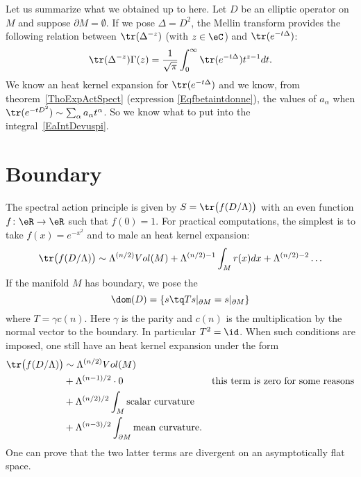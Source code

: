 Let us summarize what we obtained up to here. Let $D$ be an elliptic operator on $M$ and suppose $\partial M=\emptyset$. If we pose $\Delta=D^2$, the Mellin transform provides the following relation between $\tr(\Delta^{-z})$ (with $z\in\eC$) and $\tr( e^{-t\Delta})$:
\begin{equation}		\label{EaIntDevuspi}
	\tr(\Delta^{-z})\Gamma(z)=\frac{1}{ \sqrt{\pi} }\int_0^{\infty}\tr( e^{-t\Delta})t^{z-1}dt.
\end{equation}
We know an heat kernel expansion for $\tr( e^{-t\Delta})$ and we know, from theorem~\ref{ThoExpActSpect} (expression \eqref{Eqfbetaintdonne}), the values of $a_{\alpha}$ when $\tr( e^{-tD^2})\sim\sum_{\alpha}a_{\alpha}t^{\alpha}$. So we know what to put into the integral~\ref{EaIntDevuspi}.

\section{Boundary}

The spectral action principle is given by $S=\tr\big( f(D/\Lambda) \big)$ with an even function $f\colon \eR\to \eR$ such that $f(0)=1$. For practical computations, the simplest is to take $f(x)= e^{-x^2}$ and to male an heat kernel expansion:
\[
	\tr\big( f(D/\Lambda) \big)\sim \Lambda^{(n/2)}Vol(M)+\Lambda^{(n/2)-1}\int_Mr(x)dx+\Lambda^{(n/2)-2}\ldots
\]
If the manifold $M$ has boundary, we pose the 
\begin{equation}
	\dom(D)=\{ s\tq Ts|_{\partial M}=s|_{\partial M} \}
\end{equation}
where $T=\gamma c(n)$. Here $\gamma$ is the parity and $c(n)$ is the multiplication by the normal vector to the boundary. In particular $T^2=\id$. When such conditions are imposed, one still have an heat kernel expansion under the form
\begin{align}
	\tr\big( f(D/\Lambda) \big) & \sim \Lambda^{(n/2)}Vol(M)                                                                                \\
	                            & +\Lambda^{(n-1)/2}\cdot 0                                   & \textrm{this term is zero for some reasons} \\
	                            & +\Lambda^{(n/2)/2}\int_M \textrm{scalar curvature}                                                        \\
	                            & +\Lambda^{(n-3)/2}\int_{\partial M}\textrm{mean curvature}.
\end{align}
One can prove that the two latter terms are divergent on an asymptotically flat space.

